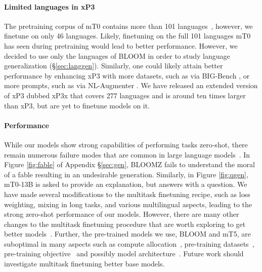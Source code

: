\documentclass[11pt]{article}
\begin{document}
\paragraph{Limited languages in xP3} The pretraining corpus of mT0 contains more than 101 languages~\cite{xue2020mt5}, however, we finetune on only 46 languages. Likely, finetuning on the full 101 languages mT0 has seen during pretraining would lead to better performance. However, we decided to use only the languages of BLOOM in order to study language generalization (\S\ref{sec:langgen}). Similarly, one could likely attain better performance by enhancing xP3 with more datasets, such as via BIG-Bench \cite{srivastava2022beyond,suzgun2022challenging}, or more prompts, such as via NL-Augmenter \cite{dhole2021nl}. We have released an extended version of xP3 dubbed xP3x that covers 277 languages and is around ten times larger than xP3, but are yet to finetune models on it.

\paragraph{Performance} While our models show strong capabilities of performing tasks zero-shot, there remain numerous failure modes that are common in large language models~\cite{rae2021scaling,bommasani2021opportunities,zhang2022opt,smith2022using,ouyang2022training,taylor2022galactica,chowdhery2022palm,biderman2023pythia,allal2023santacoder,li2023starcoder}. In Figure \ref{fig:fable} of Appendix \S\ref{sec:gen}, BLOOMZ fails to understand the moral of a fable resulting in an undesirable generation. Similarly, in Figure \ref{fig:qgen}, mT0-13B is asked to provide an explanation, but answers with a question. We have made several modifications to the multitask finetuning recipe, such as loss weighting, mixing in long tasks, and various multilingual aspects, leading to the strong zero-shot performance of our models. However, there are many other changes to the multitask finetuning procedure that are worth exploring to get better models~\cite{honovich2022unnatural,wang2022self,longpre2023flan,liu2023zero,dettmers2023qlora}. Further, the pre-trained models we use, BLOOM and mT5, are suboptimal in many aspects such as compute allocation~\cite{hoffmann2022training,muennighoff2023scaling}, pre-training datasets~\cite{longpre2023pretrainer,touvron2023llama,chung2023unimax}, pre-training objective~\cite{tay2022ul2} and possibly model architecture~\cite{komatsuzaki2022sparse,shen2023flan}. Future work should investigate multitask finetuning better base models.
\end{document}
